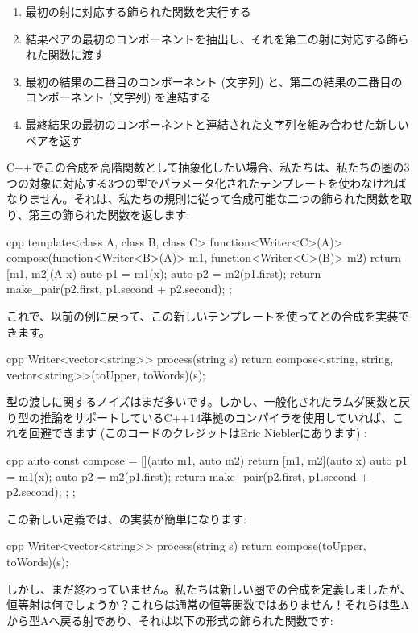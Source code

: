 \begin{enumerate}
  \tightlist
  \item
        最初の射に対応する飾られた関数を実行する
  \item
        結果ペアの最初のコンポーネントを抽出し、それを第二の射に対応する飾られた関数に渡す
  \item
        最初の結果の二番目のコンポーネント (文字列) と、第二の結果の二番目のコンポーネント (文字列) を連結する
  \item
        最終結果の最初のコンポーネントと連結された文字列を組み合わせた新しいペアを返す
\end{enumerate}

C++でこの合成を高階関数として抽象化したい場合、私たちは、私たちの圏の3つの対象に対応する3つの型でパラメータ化されたテンプレートを使わなければなりません。それは、私たちの規則に従って合成可能な二つの飾られた関数を取り、第三の飾られた関数を返します:

\begin{snip}{cpp}
template<class A, class B, class C>
function<Writer<C>(A)> compose(function<Writer<B>(A)> m1,
                               function<Writer<C>(B)> m2)
{
    return [m1, m2](A x) {
        auto p1 = m1(x);
        auto p2 = m2(p1.first);
        return make_pair(p2.first, p1.second + p2.second); 
    };
}
\end{snip}
これで、以前の例に戻って、この新しいテンプレートを使ってとの合成を実装できます。

\begin{snip}{cpp}
Writer<vector<string>> process(string s) { 
    return compose<string, string, vector<string>>(toUpper, toWords)(s);
}
\end{snip}
型の渡しに関するノイズはまだ多いです。しかし、一般化されたラムダ関数と戻り型の推論をサポートしているC++14準拠のコンパイラを使用していれば、これを回避できます (このコードのクレジットはEric Nieblerにあります) :

\begin{snip}{cpp}
auto const compose = [](auto m1, auto m2) { 
    return [m1, m2](auto x) { 
        auto p1 = m1(x);
        auto p2 = m2(p1.first);
        return make_pair(p2.first, p1.second + p2.second);
    };
};
\end{snip}
この新しい定義では、の実装が簡単になります:

\begin{snip}{cpp}
Writer<vector<string>> process(string s) {
    return compose(toUpper, toWords)(s);
}
\end{snip}
しかし、まだ終わっていません。私たちは新しい圏での合成を定義しましたが、恒等射は何でしょうか？これらは通常の恒等関数ではありません！それらは型Aから型Aへ戻る射であり、それは以下の形式の飾られた関数です:


